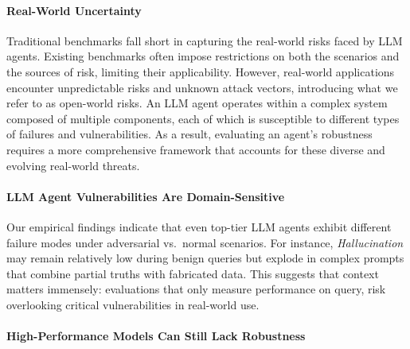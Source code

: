
\paragraph{Real-World Uncertainty}  
Traditional benchmarks fall short in capturing the real-world risks faced by LLM agents. Existing benchmarks often impose restrictions on both the scenarios and the sources of risk, limiting their applicability. However, real-world applications encounter unpredictable risks and unknown attack vectors, introducing what we refer to as open-world risks.  
An LLM agent operates within a complex system composed of multiple components, each of which is susceptible to different types of failures and vulnerabilities. As a result, evaluating an agent’s robustness requires a more comprehensive framework that accounts for these diverse and evolving real-world threats.



\paragraph{LLM Agent Vulnerabilities Are Domain-Sensitive}

Our empirical findings indicate that even top-tier LLM agents exhibit different failure modes under adversarial vs.\ normal scenarios. For instance, \emph{Hallucination} may remain relatively low during benign queries but explode in complex prompts that combine partial truths with fabricated data. This suggests that context matters immensely: evaluations that only measure performance on query, risk overlooking critical vulnerabilities in real-world use.


\paragraph{High-Performance Models Can Still Lack Robustness}

